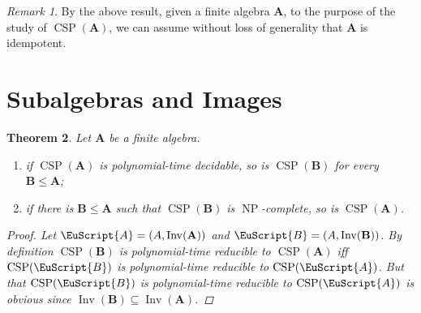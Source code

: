 \documentclass{amsart}
\theoremstyle{plain}
\newtheorem{theorem}{Theorem}[section]
\theoremstyle{definition}
\theoremstyle{remark}
\newtheorem{remark}[theorem]{Remark}
\DeclareMathOperator{\CSP}{CSP}
\DeclareMathOperator{\Inv}{Inv}
\DeclareMathOperator{\NP}{NP}
\begin{document}
\begin{remark}
    By the above result, given a finite algebra $\mathbf{A}$, to the purpose of the study of $\CSP(\mathbf{A})$, we can assume without loss of generality that $\mathbf{A}$ is idempotent. 
\end{remark}

\section{Subalgebras and Images}

\begin{theorem}
    \label{sub}
    Let $\mathbf{A}$ be a finite algebra. 
    \begin{enumerate}
        \item if $\CSP(\mathbf{A})$ is polynomial-time decidable, so is $\CSP(\mathbf{B})$ for every $\mathbf{B} \le \mathbf{A}$; 
        \item if there is $\mathbf{B} \le \mathbf{A}$ such that $\CSP(\mathbf{B})$ is $\NP$-complete, so is $\CSP(\mathbf{A})$. 
    \end{enumerate}
    \begin{proof}
    Let $\EuScript{A}=(A, \Inv(\mathbf{A}))$ and $\EuScript{B}=(A, \Inv(\mathbf{B}))$. 
    By definition $\CSP(\mathbf{B})$ is polynomial-time reducible to $\CSP(\mathbf{A})$ iff 
    $\CSP(\EuScript{B})$ is polynomial-time reducible to $\CSP(\EuScript{A})$.
    But that $\CSP(\EuScript{B})$ is polynomial-time reducible to $\CSP(\EuScript{A})$ is obvious since $\Inv(\mathbf{B}) \subseteq \Inv(\mathbf{A})$.
    \end{proof}
\end{theorem}
\end{document}
